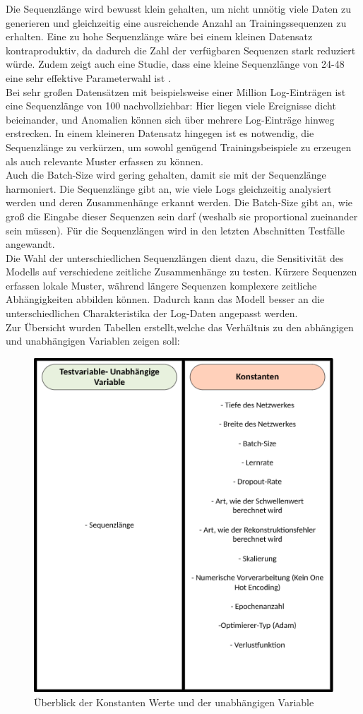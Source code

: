 \documentclass[a4paper,12pt]{article}
\begin{document}
	Die Sequenzlänge wird bewusst klein gehalten, um nicht unnötig viele Daten zu generieren und gleichzeitig eine ausreichende Anzahl an Trainingssequenzen zu erhalten. Eine zu hohe Sequenzlänge wäre bei einem kleinen Datensatz kontraproduktiv, da dadurch die Zahl der verfügbaren Sequenzen stark reduziert würde. Zudem zeigt auch eine Studie, dass eine kleine Sequenzlänge von 24-48 eine sehr effektive Parameterwahl ist \cite{Toor2022}. 
	\\[0.5em]
	Bei sehr großen Datensätzen mit beispielsweise einer Million Log-Einträgen ist eine Sequenzlänge von 100 nachvollziehbar: Hier liegen viele Ereignisse dicht beieinander, und Anomalien können sich über mehrere Log-Einträge hinweg erstrecken. In einem kleineren Datensatz hingegen ist es notwendig, die Sequenzlänge zu verkürzen, um sowohl genügend Trainingsbeispiele zu erzeugen als auch relevante Muster erfassen zu können.
	\\[0.5em]
	Auch die Batch-Size wird gering gehalten, damit sie mit der Sequenzlänge harmoniert. Die Sequenzlänge gibt an, wie viele Logs gleichzeitig analysiert werden und deren Zusammenhänge erkannt werden. Die Batch-Size gibt an, wie groß die Eingabe dieser Sequenzen sein darf (weshalb sie proportional zueinander sein müssen). Für die Sequenzlängen wird in den letzten Abschnitten Testfälle angewandt.
	\\[0.5em]
	Die Wahl der unterschiedlichen Sequenzlängen dient dazu, die Sensitivität des Modells auf verschiedene zeitliche Zusammenhänge zu testen. Kürzere Sequenzen erfassen lokale Muster, während längere Sequenzen komplexere zeitliche Abhängigkeiten abbilden können. Dadurch kann das Modell besser an die unterschiedlichen Charakteristika der Log-Daten angepasst werden.
	\\[0.5em]
	Zur Übersicht wurden Tabellen erstellt,welche das Verhältnis zu den abhängigen und unabhängigen Variablen zeigen soll:
	\\[0.5em]
	
	\begin{figure}[H]
		\centering
		\includegraphics[width=0.7\linewidth]{Bilder/variablen-architektur}
		\caption{Überblick der Konstanten Werte und der unabhängigen Variable}
		\label{fig:variablen-architektur}
	\end{figure}
\end{document}
